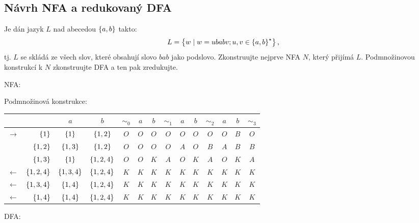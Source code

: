 \subsection{Návrh NFA a redukovaný DFA}
Je dán jazyk $L$ nad abecedou $\left\lbrace a,b \right\rbrace$ takto:
\[L = \left\lbrace w \mid w = ubabv; u,v\in\left\lbrace a,b \right\rbrace^\star \right\rbrace\text{,}\]
tj. $L$ se skládá ze všech slov, které obsahují slovo $bab$ jako podslovo. Zkonstruujte nejprve NFA $N$, který přijímá
$L$. Podmnožinovou konstrukcí k $N$ zkonstruujte DFA a ten pak zredukujte.

NFA:


Podmnožinová konstrukce:

\begin{tabular}{|r r|c c||c|c c||c|c c||c|c c||c|}
    \hline
    & & $a$ & $b$ & $ \sim_0 $ & $a$ & $b$ & $\sim_1$ & $a$ & $b$ & $\sim_2$ & $a$ & $b$ & $\sim_3$ \\ \hline \hline
    $\to$  & $\left\lbrace 1 \right\rbrace$    & $\left\lbrace 1 \right\rbrace$    & $\left\lbrace 1,2 \right\rbrace$   & $O$ & $O$ & $O$ & $O$ & $O$ & $O$ & $O$ & $O$ & $B$ & $O$ \\
           & $\left\lbrace 1,2 \right\rbrace$  & $\left\lbrace 1,3 \right\rbrace$  & $\left\lbrace 1,2 \right\rbrace$   & $O$ & $O$ & $O$ & $O$ & $A$ & $O$ & $B$ & $A$ & $B$ & $B$ \\
           & $\left\lbrace 1,3 \right\rbrace$  & $\left\lbrace 1 \right\rbrace$    & $\left\lbrace 1,2,4 \right\rbrace$ & $O$ & $O$ & $K$ & $A$ & $O$ & $K$ & $A$ & $O$ & $K$ & $A$ \\
    $\gets$& $\left\lbrace 1,2,4 \right\rbrace$& $\left\lbrace 1,3,4 \right\rbrace$& $\left\lbrace 1,2,4 \right\rbrace$ & $K$ & $K$ & $K$ & $K$ & $K$ & $K$ & $K$ & $K$ & $K$ & $K$ \\
    $\gets$& $\left\lbrace 1,3,4 \right\rbrace$& $\left\lbrace 1,4 \right\rbrace$  & $\left\lbrace 1,2,4 \right\rbrace$ & $K$ & $K$ & $K$ & $K$ & $K$ & $K$ & $K$ & $K$ & $K$ & $K$ \\
    $\gets$& $\left\lbrace 1,4 \right\rbrace$  & $\left\lbrace 1,4 \right\rbrace$  & $\left\lbrace 1,2,4 \right\rbrace$ & $K$ & $K$ & $K$ & $K$ & $K$ & $K$ & $K$ & $K$ & $K$ & $K$ \\
    \hline
\end{tabular}

DFA:

